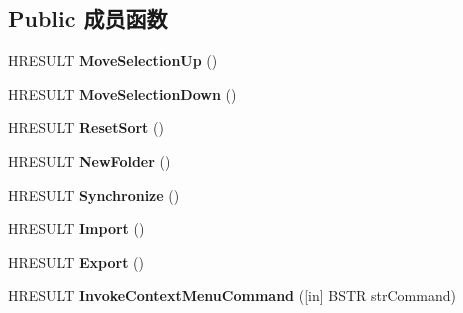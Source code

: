 \subsection*{Public 成员函数}
\begin{DoxyCompactItemize}
\item 
\mbox{\label{interface_s_h_doc_vw_1_1_i_shell_favorites_name_space_a21cdc7f4d3553d72b7c5134c66edbf72}} 
H\+R\+E\+S\+U\+LT {\bfseries Move\+Selection\+Up} ()
\item 
\mbox{\label{interface_s_h_doc_vw_1_1_i_shell_favorites_name_space_aa7ad4b7a223c9594612f3cc2a7f136ea}} 
H\+R\+E\+S\+U\+LT {\bfseries Move\+Selection\+Down} ()
\item 
\mbox{\label{interface_s_h_doc_vw_1_1_i_shell_favorites_name_space_aa0452db6fc9a395ef6b0318533a23df8}} 
H\+R\+E\+S\+U\+LT {\bfseries Reset\+Sort} ()
\item 
\mbox{\label{interface_s_h_doc_vw_1_1_i_shell_favorites_name_space_ab98ae69572652c0201ebd16fa99f09fa}} 
H\+R\+E\+S\+U\+LT {\bfseries New\+Folder} ()
\item 
\mbox{\label{interface_s_h_doc_vw_1_1_i_shell_favorites_name_space_ad8b0f851e77ec47b40251915d455a723}} 
H\+R\+E\+S\+U\+LT {\bfseries Synchronize} ()
\item 
\mbox{\label{interface_s_h_doc_vw_1_1_i_shell_favorites_name_space_aa7e9fc245bd2a85f20e6e3b613733c0e}} 
H\+R\+E\+S\+U\+LT {\bfseries Import} ()
\item 
\mbox{\label{interface_s_h_doc_vw_1_1_i_shell_favorites_name_space_ab7efb464914cf2aef4af185e4f4d30fb}} 
H\+R\+E\+S\+U\+LT {\bfseries Export} ()
\item 
\mbox{\label{interface_s_h_doc_vw_1_1_i_shell_favorites_name_space_a25d96aaa312bafad508742de009331c8}} 
H\+R\+E\+S\+U\+LT {\bfseries Invoke\+Context\+Menu\+Command} (\mbox{[}in\mbox{]} B\+S\+TR str\+Command)

\end{DoxyCompactItemize}
